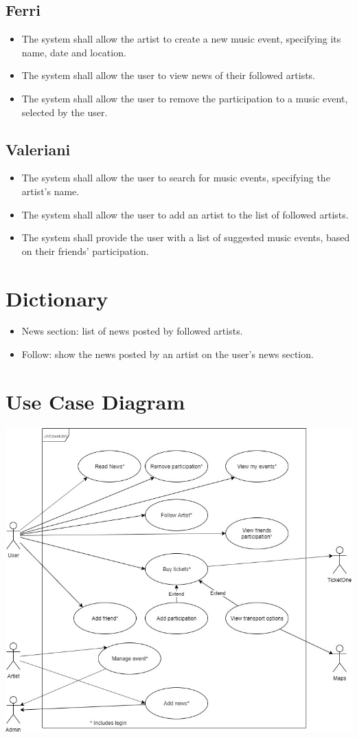 \documentclass[11pt,a4paper]{article}
\begin{document}
\subsection{Ferri}
\begin{itemize}
\item The system shall allow the artist to create a new music event, specifying its name, date and location.
\item The system shall allow the user to view news of their followed artists.
\item The system shall allow the user to remove the participation to a music event, selected by the user.
\end{itemize}
\subsection{Valeriani}
\begin{itemize}
\item The system shall allow the user to search for music events, specifying the artist’s name.
\item The system shall allow the user to add an artist to the list of followed artists.
\item The system shall provide the user with a list of suggested music events, based on their friends' participation.
\end{itemize}
\section{Dictionary}
\begin{itemize}
\item News section: list of news posted by followed artists.
\item Follow: show the news posted by an artist on the user's news section.
\end{itemize}
\section{Use Case Diagram}
\hspace*{-4cm}  
\includegraphics[scale=0.7]{UseCaseFinal.jpg}
\end{document}
